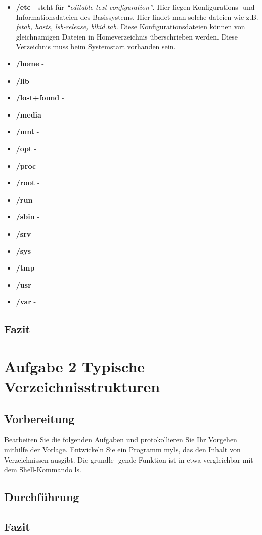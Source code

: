 \begin{itemize}
\begin{itemize}
			\item \textbf{/etc} - steht für \textit{``editable text configuration''}.
			Hier liegen Konfigurations- und Informationsdateien des Basissystems.
			Hier findet man solche dateien wie z.B. \textit{fstab, hosts, lsb-release, blkid.tab}.
			Diese Konfigurationsdateien können von gleichnamigen Dateien in Homeverzeichnis überschrieben werden.
			Diese Verzeichnis muss beim Systemstart vorhanden sein.
			\item \textbf{/home} -
			\item \textbf{/lib} -
			\item \textbf{/lost+found} -
			\item \textbf{/media} -
			\item \textbf{/mnt} -
			\item \textbf{/opt} -
			\item \textbf{/proc} -
			\item \textbf{/root} -
			\item \textbf{/run} -
			\item \textbf{/sbin }-
			\item \textbf{/srv }-
			\item \textbf{/sys} -
			\item \textbf{/tmp} -
			\item \textbf{/usr} -
			\item \textbf{/var }-

		\end{itemize}



	\end{itemize}

	\subsection{Fazit}

\newpage
\section{Aufgabe 2 Typische Verzeichnisstrukturen}
\subsection{Vorbereitung}
Bearbeiten Sie die folgenden Aufgaben und protokollieren Sie Ihr Vorgehen mithilfe der Vorlage.
Entwickeln Sie ein Programm myls, das den Inhalt von Verzeichnissen ausgibt. Die grundle-
gende Funktion ist in etwa vergleichbar mit dem Shell-Kommando ls.

\subsection{Durchführung}

\subsection{Fazit}

